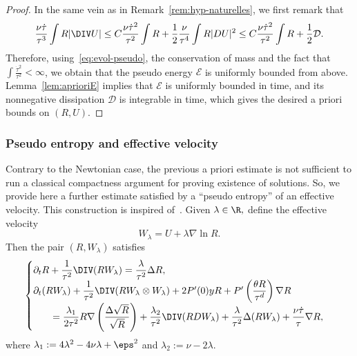 \begin{proof}
In the same vein as in Remark~\ref{rem:hyp-naturelles}, we first remark that
\[
\frac{\nu \dot \tau}{\tau^3} \int R |\DIV U|
\le C \frac{\nu \dot \tau^2}{\tau^2} \int R + \frac12 \frac{\nu}{\tau^4} \int R |DU|^2
\le C \frac{\nu \dot \tau^2}{\tau^2} \int R + \frac12 \mathcal D.
\]
Therefore, using~\eqref{eq:evol-pseudo}, the conservation of mass and the fact that $\int \frac{\dot \tau^2}{\tau^2} < \infty$, we obtain that the pseudo energy $\mathcal E$ is uniformly bounded from above. Lemma~\ref{lem:aprioriE} implies that $\mathcal E$ is uniformly bounded in time, and its nonnegative dissipation $\mathcal D$ is integrable in time, which gives the desired a priori bounds on $(R,U)$.
\end{proof}

\subsubsection{Pseudo entropy and effective velocity}

Contrary to the Newtonian case, the previous a priori estimate is not sufficient to run a classical compactness argument for proving existence of solutions. So, we provide here a further estimate satisfied by a ``pseudo entropy'' of an effective velocity. This construction is inspired of~\cite{AS-comp}. Given $\lambda \in \R,$ define the effective velocity
\[
W_\lambda = U + \lambda \nabla \ln R.
\]
Then the pair $(R,W_\lambda)$ satisfies
\begin{equation}\label{eq:RWlambda}
\begin{cases}
\partial_t R + \dfrac{1}{\tau^2} \DIV (R W_\lambda) = \dfrac{\lambda}{\tau^2} \Delta R, \\
\partial_t (R W_\lambda) + \dfrac{1}{\tau^2} \DIV (R W_\lambda \otimes W_\lambda) + 2 P'(0) y R + P'\left(\dfrac{\theta R}{\tau^d}\right) \nabla R \\
\qquad = \dfrac{\lambda_1}{2\tau^2} R \nabla \left(\dfrac{\Delta \sqrt R}{\sqrt R} \right) +\dfrac{\lambda_2}{\tau^2} \DIV(R D W_\lambda) +\dfrac{\lambda}{\tau^2} \Delta(R W_\lambda) + \dfrac{\nu \dot \tau}{\tau}\nabla R,
\end{cases}
\end{equation}
where $\lambda_1 := 4\lambda^2 - 4\nu \lambda + \eps^2$ and $\lambda_2 := \nu - 2 \lambda$.

